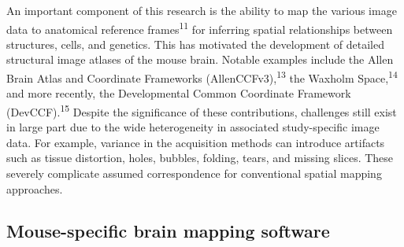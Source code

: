 \documentclass[
  12pt,
]{article}
\begin{document}
An important component of this research is the ability to map the
various image data to anatomical reference frames\textsuperscript{11}
for inferring spatial relationships between structures, cells, and
genetics. This has motivated the development of detailed structural
image atlases of the mouse brain. Notable examples include the Allen
Brain Atlas and Coordinate Frameworks (AllenCCFv3),\textsuperscript{13}
the Waxholm Space,\textsuperscript{14} and more recently, the
Developmental Common Coordinate Framework (DevCCF).\textsuperscript{15}
Despite the significance of these contributions, challenges still exist
in large part due to the wide heterogeneity in associated study-specific
image data. For example, variance in the acquisition methods can
introduce artifacts such as tissue distortion, holes, bubbles, folding,
tears, and missing slices. These severely complicate assumed
correspondence for conventional spatial mapping approaches.

\hypertarget{mouse-specific-brain-mapping-software}{%
\subsection{Mouse-specific brain mapping
software}\label{mouse-specific-brain-mapping-software}}
\end{document}
